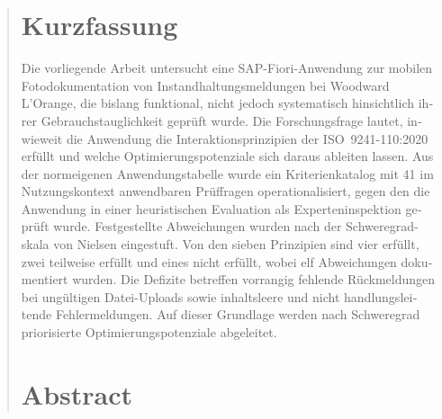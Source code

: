 \begin{abstract}
\thispagestyle{kapitelkopfzeile}


\begin{otherlanguage}{ngerman}
\section*{Kurzfassung}

Die vorliegende Arbeit untersucht eine SAP-Fiori-Anwendung zur mobilen Fotodokumentation von Instandhaltungsmeldungen 
bei Woodward L'Orange, die bislang funktional, nicht jedoch systematisch hinsichtlich ihrer Gebrauchstauglichkeit geprüft wurde.
Die Forschungsfrage lautet, inwieweit die Anwendung die Interaktionsprinzipien der ISO~9241-110:2020 erfüllt und welche 
Optimierungspotenziale sich daraus ableiten lassen.
Aus der normeigenen Anwendungstabelle wurde ein Kriterienkatalog mit 41 im Nutzungskontext anwendbaren Prüffragen operationalisiert, 
gegen den die Anwendung in einer heuristischen Evaluation als Experteninspektion geprüft wurde.
Festgestellte Abweichungen wurden nach der Schweregradskala von Nielsen eingestuft.
Von den sieben Prinzipien sind vier erfüllt, zwei teilweise erfüllt und eines nicht erfüllt, 
wobei elf Abweichungen dokumentiert wurden.
Die Defizite betreffen vorrangig fehlende Rückmeldungen bei ungültigen Datei-Uploads sowie inhaltsleere 
und nicht handlungsleitende Fehlermeldungen.
Auf dieser Grundlage werden nach Schweregrad priorisierte Optimierungspotenziale abgeleitet.
\end{otherlanguage}

\begin{otherlanguage}{english}
\section*{Abstract}


\end{otherlanguage}
\end{abstract}
